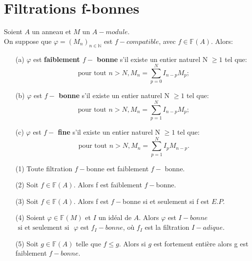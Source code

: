 \section{Filtrations f-bonnes}
\begin{madefinition}
	\label{maprop11}
	Soient $A$ un anneau et $M$ un $A-module$.\\
	On suppose que $\varphi=(M_n)_{n \in \mathbb{N}}$ est $f-compatible$, avec $f \in \mathbb{F}(A)$. Alors:
	\begin{itemize}
		\item[(a)] $\varphi$ est \textbf{faiblement $f-$ bonne} s'il existe un entier naturel N $\geqslant 1$ tel que:
		\[\text{ pour tout } n > N, M_{n}=\sum_{p=0}^{N}I_{n-p}M_{p}; \]
		\item[(b)] $\varphi$ est \textbf{$f-$ bonne} s'il existe un entier naturel N $\geqslant 1$ tel que:
		\[\text{ pour tout } n > N, M_{n}=\sum_{p=1}^{N}I_{n-p}M_{p}; \]
		\item[(c)] $\varphi$ est \textbf{$f-$ fine} s'il existe un entier naturel N $\geqslant 1$ tel que:
		\[\text{ pour tout } n > N, M_{n}=\sum_{p=1}^{N}I_{p}M_{n-p}. \]
	\end{itemize} 
\end{madefinition}
\begin{maremarque}
	\label{maprop6}
	\begin{enumerate}
		\item[(1)] Toute filtration $f-$bonne est faiblement $f-$ bonne.
		\item[(2)] Soit $f \in \mathbb{F}(A)$. Alors f est faiblement $f-$bonne.
		\item[(3)] Soit $f \in \mathbb{F}(A)$. Alors f est $f-$bonne si et seulement si f est $E.P.$
		\item[(4)] Soient $\varphi \in \mathbb{F}(M)$ et $I$ un idéal de $A$. Alors $\varphi$ est $I-bonne$ $\text{ si et seulement si }$ $\varphi$ est $f_{I}-bonne$, où $f_{I}$ est la filtration $I-adique$.
		\item[(5)] Soit $g \in \mathbb{F}(A)$ telle que $f \leqslant g$. Alors si $g$ est fortement entière alors g est faiblement $f-bonne$.
	\end{enumerate}
\end{maremarque}

